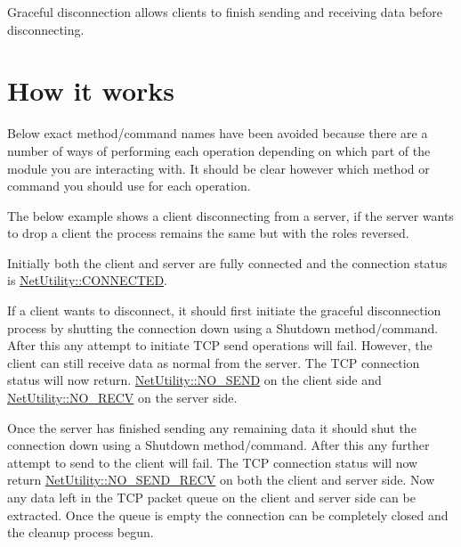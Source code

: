 Graceful disconnection allows clients to finish sending and receiving data before disconnecting. \hypertarget{graceful_disconnect_page_howItWorks}{}\section{How it works}\label{graceful_disconnect_page_howItWorks}
Below exact method/command names have been avoided because there are a number of ways of performing each operation depending on which part of the module you are interacting with. It should be clear however which method or command you should use for each operation. \par
\par


The below example shows a client disconnecting from a server, if the server wants to drop a client the process remains the same but with the roles reversed. \par
\par


Initially both the client and server are fully connected and the connection status is \hyperlink{class_net_utility_a7eae52138f8bd597ffc67ebf07e86b6da9c07ac24fb9bdd4157ace978968721fd}{NetUtility::CONNECTED}.\par
 

If a client wants to disconnect, it should first initiate the graceful disconnection process by shutting the connection down using a Shutdown method/command. After this any attempt to initiate TCP send operations will fail. However, the client can still receive data as normal from the server. The TCP connection status will now return. \hyperlink{class_net_utility_a7eae52138f8bd597ffc67ebf07e86b6da1bcc92a56bd754f0e02e33787f7f9e38}{NetUtility::NO\_\-SEND} on the client side and \hyperlink{class_net_utility_a7eae52138f8bd597ffc67ebf07e86b6dad749d5c33d1f4fda670efe634f651885}{NetUtility::NO\_\-RECV} on the server side. \par
 

Once the server has finished sending any remaining data it should shut the connection down using a Shutdown method/command. After this any further attempt to send to the client will fail. The TCP connection status will now return \hyperlink{class_net_utility_a7eae52138f8bd597ffc67ebf07e86b6dabfdb16770f1140f86d621739ffe89560}{NetUtility::NO\_\-SEND\_\-RECV} on both the client and server side. Now any data left in the TCP packet queue on the client and server side can be extracted. Once the queue is empty the connection can be completely closed and the cleanup process begun. \par
  